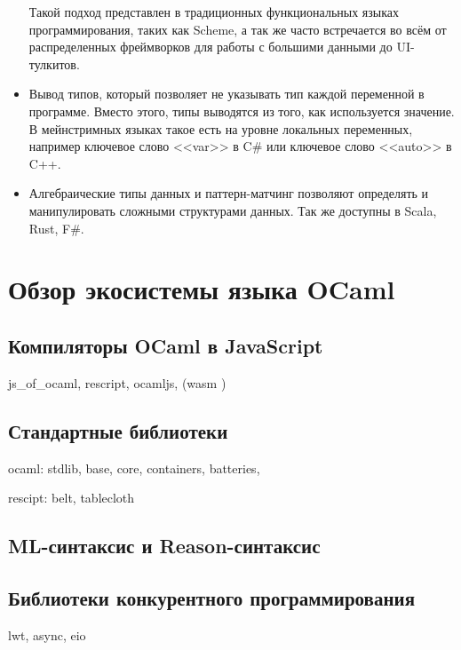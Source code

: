 \begin{itemize}
          Такой подход представлен в традиционных функциональных языках программирования, таких как Scheme, а так же часто встречается
          во всём от распределенных фреймворков для работы с большими данными до UI-тулкитов.
    \item Вывод типов, который позволяет не указывать тип каждой переменной в программе.
          Вместо этого, типы выводятся из того, как используется значение. В мейнстримных языках
          такое есть на уровне локальных переменных, например ключевое слово <<var>> в C\# или ключевое слово <<auto>> в C++.
    \item Алгебраические типы данных и паттерн-матчинг позволяют определять и манипулировать сложными структурами данных.
          Так же доступны в Scala, Rust, F\#.

\end{itemize}

\section{Обзор экосистемы языка OCaml}

\TODO

\subsection{Компиляторы OCaml в JavaScript}\label{jsoo}

js\_of\_ocaml, rescript, ocamljs, (wasm \TODO) \TODO

\subsection{Стандартные библиотеки}

\TODO

ocaml: stdlib, base, core, containers, batteries,

rescipt: belt, tablecloth

\subsection{ML-синтаксис и Reason-синтаксис}

\TODO

\subsection{Библиотеки конкурентного программирования}

lwt, async, eio \TODO


